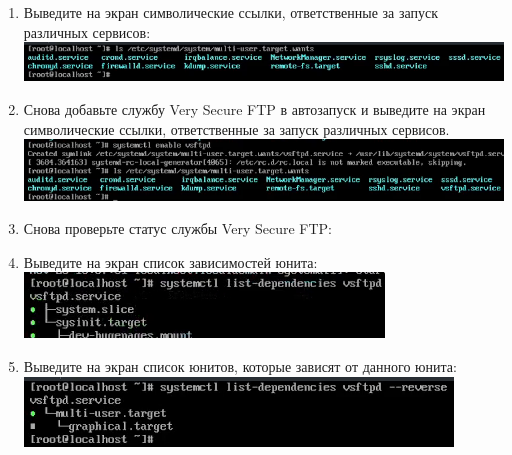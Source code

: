 \documentclass[12pt]{article}
\begin{document}
\begin{enumerate}
	\item Выведите на экран символические ссылки, ответственные за запуск различных сервисов: \\
	      \includegraphics{5.png}
	\item Снова добавьте службу Very Secure FTP в автозапуск и выведите на экран символические ссылки, ответственные за запуск различных сервисов. \\
	      \includegraphics{6.png}
	\item Снова проверьте статус службы Very Secure FTP:
	\item Выведите на экран список зависимостей юнита: \\
	      \includegraphics{7.png}
	\item Выведите на экран список юнитов, которые зависят от данного юнита: \\
	      \includegraphics{8.png}
\end{enumerate}
\end{document}
